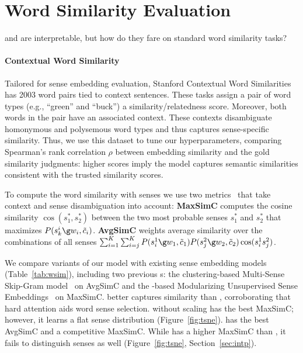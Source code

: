 
\section{Word Similarity Evaluation}
\label{sec:wordsim}

\gasi{} and \gasi{-$\beta$} are interpretable, but how do they fare on
standard word similarity tasks?

\paragraph{Contextual Word Similarity}
Tailored for sense embedding evaluation, Stanford Contextual Word
Similarities~\citep[]{huang2012improving} has 2003 word
pairs tied to context sentences.
These tasks assign a pair of word types (e.g., ``green'' and ``buck'') a
similarity/relatedness score.
Moreover, both words in the pair have an associated context.
These contexts disambiguate homonymous and polysemous
word types and thus captures sense-specific similarity.
Thus, we use this dataset to tune our hyperparameters, comparing
Spearman's rank correlation $\rho$ between
embedding similarity and the gold similarity judgments: higher
scores imply the model captures semantic similarities consistent with
the trusted similarity scores.

To compute the word similarity with senses we use two
metrics~\cite{Reisinger2010} that take context and sense
disambiguation into account:
\textbf{MaxSimC} computes the cosine similarity $\cos(s_1^*, s_2^*)$
between the two most probable senses $s_1^*$ and $s_2^*$ that
maximizes $P(s_k^i \g w_i, \tilde{c}_i)$.
\textbf{AvgSimC} weights average similarity over the combinations of
all senses $\sum_{i=1}^{K}\sum_{i=j}^{K} P(s_{i}^1 \g w_1,
\tilde{c}_1) P(s_{j}^2\g w_2,\tilde{c}_2)\cos(s_i^1 s_j^2)$.

\smallskip
We compare variants of our model with existing sense embedding
models (Table~\ref{tab:wsim}), including two previous s: 
the clustering-based Multi-Sense Skip-Gram
model~\cite[]{neelakantan2015efficient} on AvgSimC 
and the -based Modularizing Unsupervised Sense
Embeddings~\cite[]{Muse} on MaxSimC.
\gasi{} better captures similarity than \sasi{},
corroborating that hard attention aids word sense selection.
\gasi{}
without scaling has the best MaxSimC; however, it learns a
flat sense distribution (Figure~\ref{fig:tsne}).
\gasi{-$\beta$} has
the best AvgSimC and a competitive MaxSimC.
While  has a
higher MaxSimC than \gasi{-$\beta$}, it fails to distinguish senses as
well (Figure~\ref{fig:tsne}, Section~\ref{sec:intp}).

